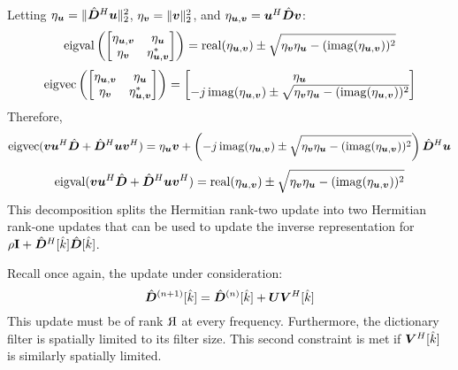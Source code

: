 Letting $\eta_{\bm{u}} = \|\hat{\bm{D}}^H\bm{u}\|_2^2$, $\eta_{\bm{v}} = \|\bm{v}\|_2^2$, and $\eta_{\bm{u},\bm{v}} = \bm{u}^H\hat{\bm{D}}\bm{v}$:
%
\begin{equation}
\operatorname{eigval}\left(\begin{bmatrix}
\eta_{\bm{u},\bm{v}} & \eta_{\bm{u}} \\
\eta_{\bm{v}}    & \eta_{\bm{u},\bm{v}}^*
\end{bmatrix}\right)
= \operatorname{real}(\eta_{\bm{u},\bm{v}}) \pm \sqrt{\eta_{\bm{v}}\eta_{\bm{u}} - (\operatorname{imag}(\eta_{\bm{u},\bm{v}}))^2}
\end{equation}
%
\begin{equation}
\operatorname{eigvec}
\left(\begin{bmatrix}
\eta_{\bm{u},\bm{v}} & \eta_{\bm{u}} \\
\eta_{\bm{v}}    & \eta_{\bm{u},\bm{v}}^*
\end{bmatrix}\right)
= \begin{bmatrix}
\eta_{\bm{u}} \\
-j\operatorname{imag}(\eta_{\bm{u},\bm{v}}) \pm \sqrt{\eta_{\bm{v}}\eta_{\bm{u}} - (\operatorname{imag}(\eta_{\bm{u},\bm{v}}))^2}
\end{bmatrix}
\end{equation}
%
%
%
Therefore, 
%
\begin{equation}
\operatorname{eigvec}
(
\bm{v}\bm{u}^H\hat{\bm{D}} + \hat{\bm{D}}^H\bm{u}\bm{v}^H
) = 
\eta_{\bm{u}}\bm{v} +
\left(-j\operatorname{imag}(\eta_{\bm{u},\bm{v}}) \pm \sqrt{\eta_{\bm{v}} \eta_{\bm{u}} - (\operatorname{imag}(\eta_{\bm{u},\bm{v}}))^2}\right)\hat{\bm{D}}^H\bm{u}
\end{equation}
%
%
\begin{equation}
\operatorname{eigval}(
\bm{v}\bm{u}^H\hat{\bm{D}} + \hat{\bm{D}}^H\bm{u}\bm{v}^H
)
= \operatorname{real}(\eta_{\bm{u},\bm{v}}) \pm \sqrt{\eta_{\bm{v}}\eta_{\bm{u}} - (\operatorname{imag}(\eta_{\bm{u},\bm{v}}))^2}
\end{equation}
%
This decomposition splits the Hermitian rank-two update into two Hermitian rank-one updates that can be used to update the inverse representation for $\rho{\bf I} + \hat{\bm{D}}^H[\hat{k}]\hat{\bm{D}}[\hat{k}]$.

Recall once again, the update under consideration:
\begin{equation}
\hat{\bm{D}}^{(n + 1)}[\hat{k}] = \hat{\bm{D}}^{(n)}[\hat{k}] + \bm{U}\bm{V}^H[\hat{k}]
\end{equation}
%
This update must be of rank $
\reflectbox{R}$ at every frequency. Furthermore, the dictionary filter is spatially limited to its filter size. This second constraint is met if $\bm{V}^H[\hat{k}]$ is similarly spatially limited.

